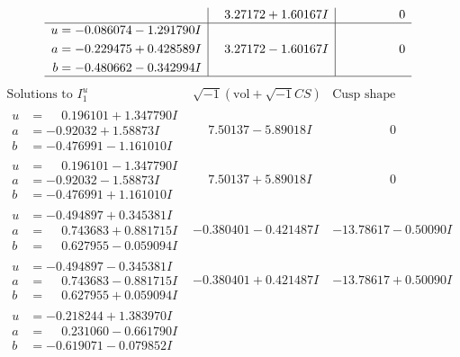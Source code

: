 \documentclass[1p]{elsarticle_modified}
\theoremstyle{definition}
\newcommand{\I}{\sqrt{-1}}
\begin{document}
$$\begin{array}{c|c|c}
 & \phantom{-}3.27172 + 1.60167 I & \phantom{-0.000000 } 0 \\ \hline\begin{aligned}
u &= -0.086074 - 1.291790 I \\
a &= -0.229475 + 0.428589 I \\
b &= -0.480662 - 0.342994 I\end{aligned}
 & \phantom{-}3.27172 - 1.60167 I & \phantom{-0.000000 } 0\\
 \hline 
 \end{array}$$\newpage$$\begin{array}{c|c|c}  
\text{Solutions to }I^u_{1}& \I (\text{vol} + \sqrt{-1}CS) & \text{Cusp shape}\\
 \hline 
\begin{aligned}
u &= \phantom{-}0.196101 + 1.347790 I \\
a &= -0.92032 + 1.58873 I \\
b &= -0.476991 - 1.161010 I\end{aligned}
 & \phantom{-}7.50137 - 5.89018 I & \phantom{-0.000000 } 0 \\ \hline\begin{aligned}
u &= \phantom{-}0.196101 - 1.347790 I \\
a &= -0.92032 - 1.58873 I \\
b &= -0.476991 + 1.161010 I\end{aligned}
 & \phantom{-}7.50137 + 5.89018 I & \phantom{-0.000000 } 0 \\ \hline\begin{aligned}
u &= -0.494897 + 0.345381 I \\
a &= \phantom{-}0.743683 + 0.881715 I \\
b &= \phantom{-}0.627955 - 0.059094 I\end{aligned}
 & -0.380401 - 0.421487 I & -13.78617 - 0.50090 I \\ \hline\begin{aligned}
u &= -0.494897 - 0.345381 I \\
a &= \phantom{-}0.743683 - 0.881715 I \\
b &= \phantom{-}0.627955 + 0.059094 I\end{aligned}
 & -0.380401 + 0.421487 I & -13.78617 + 0.50090 I \\ \hline\begin{aligned}
u &= -0.218244 + 1.383970 I \\
a &= \phantom{-}0.231060 - 0.661790 I \\
b &= -0.619071 - 0.079852 I\end{aligned}

\end{array}$$
\end{document}
